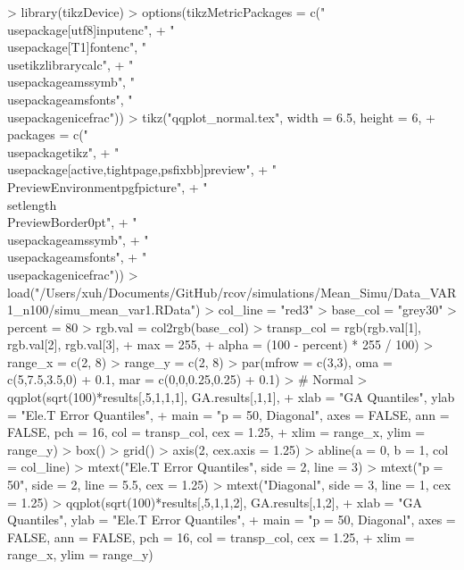 \documentclass{article}
\begin{document}


\begin{Schunk}
\begin{Sinput}
> library(tikzDevice)
> options(tikzMetricPackages = c("\\usepackage[utf8]{inputenc}",
+     "\\usepackage[T1]{fontenc}", "\\usetikzlibrary{calc}",
+     "\\usepackage{amssymb}", "\\usepackage{amsfonts}", "\\usepackage{nicefrac}"))
> tikz("qqplot_normal.tex", width = 6.5, height = 6,
+      packages = c("\\usepackage{tikz}",
+                  "\\usepackage[active,tightpage,psfixbb]{preview}",
+                  "\\PreviewEnvironment{pgfpicture}",
+                  "\\setlength\\PreviewBorder{0pt}",
+                  "\\usepackage{amssymb}",
+                  "\\usepackage{amsfonts}",
+                  "\\usepackage{nicefrac}"))
> load("/Users/xuh/Documents/GitHub/rcov/simulations/Mean_Simu/Data_VAR1_n100/simu_mean_var1.RData")
> col_line = "red3"
> base_col = "grey30"
> percent = 80
> rgb.val = col2rgb(base_col)
> transp_col = rgb(rgb.val[1], rgb.val[2], rgb.val[3],
+              max = 255,
+              alpha = (100 - percent) * 255 / 100)
> range_x = c(2, 8)
> range_y = c(2, 8)
> par(mfrow = c(3,3), oma = c(5,7.5,3.5,0) + 0.1, mar = c(0,0,0.25,0.25) + 0.1)
> # Normal
> qqplot(sqrt(100)*results[,5,1,1,1], GA.results[,1,1],
+        xlab = "GA Quantiles", ylab = "Ele.T Error Quantiles",
+        main = "p = 50, Diagonal", axes = FALSE, ann = FALSE, pch = 16, col = transp_col, cex = 1.25,
+        xlim = range_x, ylim = range_y)
> box()
> grid()
> axis(2, cex.axis = 1.25)
> abline(a = 0, b = 1, col = col_line)
> mtext("Ele.T Error Quantiles", side = 2, line = 3)
> mtext("p = 50", side = 2, line = 5.5, cex = 1.25)
> mtext("Diagonal", side = 3, line = 1, cex = 1.25)
> qqplot(sqrt(100)*results[,5,1,1,2], GA.results[,1,2],
+        xlab = "GA Quantiles", ylab = "Ele.T Error Quantiles",
+        main = "p = 50, Diagonal", axes = FALSE, ann = FALSE, pch = 16, col = transp_col, cex = 1.25,
+        xlim = range_x, ylim = range_y)

\end{Sinput}
\end{Schunk}
\end{document}
